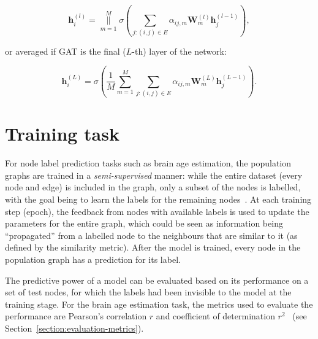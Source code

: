 \begin{equation}
    \mathbf{h}_i^{(l)} = \underset{m=1}{\overset{M}{\big\|}} \sigma\left(\sum\limits_{j: (i,j)\in E} \alpha_{ij, m}\mathbf{W}^{(l)}_m\mathbf{h}_j^{(l-1)}\right),
\end{equation}

or averaged if GAT is the final ($L$-th) layer of the network:

\begin{equation}
    \mathbf{h}_i^{(L)} = \sigma\left(\frac{1}{M}\sum\limits_{m=1}^M\sum\limits_{j: (i,j)\in E} \alpha_{ij, m}\mathbf{W}^{(L)}_m\mathbf{h}_j^{(L-1)}\right).
\end{equation}

\section{Training task}
\label{training-task}


For node label prediction tasks such as brain age estimation, the population graphs are trained in a \textit{semi-supervised} manner: while the entire dataset (every node and edge) is included in the graph, only a subset of the nodes is labelled, with the goal being to learn the labels for the remaining nodes~\cite{kipf2017semi}. At each training step (epoch), the feedback from nodes with available labels is used to update the parameters for the entire graph, which could be seen as information being ``propagated'' from a labelled node to the neighbours that are similar to it (as defined by the similarity metric). After the model is trained, every node in the population graph has a prediction for its label.

The predictive power of a model can be evaluated based on its performance on a set of test nodes, for which the labels had been invisible to the model at the training stage. For the brain age estimation task, the metrics used to evaluate the performance are Pearson's correlation $r$ and coefficient of determination $r^2$~\cite{niu2019improved} (see Section~\ref{section:evaluation-metrics}).



